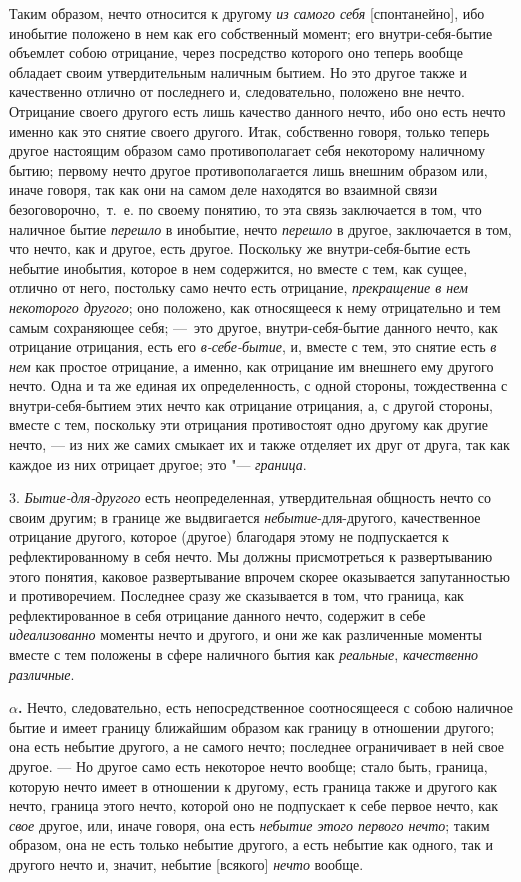 Таким образом, нечто относится к другому {\em из самого
себя} [спонтанейно], ибо инобытие положено в нем как его собственный
момент; его внутри-себя-бытие объемлет собою отрицание, через посредство
которого оно теперь вообще обладает своим утвердительным наличным бытием.
Но это другое также и качественно отлично от последнего и, следовательно,
положено вне нечто. Отрицание своего другого есть лишь качество данного
нечто, ибо оно есть нечто именно как это снятие своего другого. Итак,
собственно говоря, только теперь другое настоящим образом само
противополагает себя некоторому наличному бытию; первому нечто другое
противополагается лишь внешним образом или, иначе говоря, так как они на
самом деле находятся во взаимной связи безоговорочно,~т.~е. по своему
понятию, то эта связь заключается в том, что наличное бытие
{\em перешло} в инобытие, нечто
{\em перешло} в другое, заключается в том, что нечто,
как и другое, есть другое. Поскольку же внутри-себя-бытие есть небытие
инобытия, которое в нем содержится, но вместе с тем, как сущее, отлично от
него, постольку само нечто есть отрицание,
{\em прекращение в нем некоторого другого}; оно
положено, как относящееся к нему отрицательно и тем самым сохраняющее себя;
—~это другое, внутри-себя-бытие данного нечто, как отрицание отрицания,
есть его {\em в-себе-бытие}, и, вместе с тем, это
снятие есть {\em в нем} как простое отрицание, а
именно, как отрицание им внешнего ему другого нечто. Одна и та же единая их
определенность, с одной стороны, тождественна с внутри-себя-бытием этих
нечто как отрицание отрицания, а, с другой стороны, вместе с тем, поскольку
эти отрицания противостоят одно другому как другие нечто, — из них же самих
смыкает их и также отделяет их друг от друга, так как каждое из них
отрицает другое; это "--- {\em граница}.

3. {\em Бытие-для-другого} есть неопределенная,
утвердительная общность нечто со своим другим; в границе же выдвигается
{\em небытие}{}-для-другого, качественное отрицание
другого, которое (другое) благодаря этому не подпускается к
рефлектированному в себя нечто. Мы должны присмотреться к развертыванию
этого понятия, каковое развертывание впрочем скорее оказывается
запутанностью и противоречием. Последнее сразу же сказывается в том, что
граница, как рефлектированное в себя отрицание данного нечто, содержит в
себе {\em идеализованно} моменты нечто и другого, и они
же как различенные моменты вместе с тем положены в сфере наличного бытия
как {\em реальные},
{\em качественно различные}.

\textbf{$\alpha $.} Нечто, следовательно, есть непосредственное
соотносящееся с собою наличное бытие и имеет границу ближайшим образом как
границу в отношении другого; она есть небытие другого, а не самого нечто;
последнее ограничивает в ней свое другое. — Но другое само есть некоторое
нечто вообще; стало быть, граница, которую нечто имеет в отношении к
другому, есть граница также и другого как нечто, граница этого нечто,
которой оно не подпускает к себе первое нечто, как
{\em свое} другое, или, иначе говоря, она есть
{\em небытие этого первого нечто}; таким образом, она
не есть только небытие другого, а есть небытие как одного, так и другого
нечто и, значит, небытие [всякого] {\em нечто} вообще.

